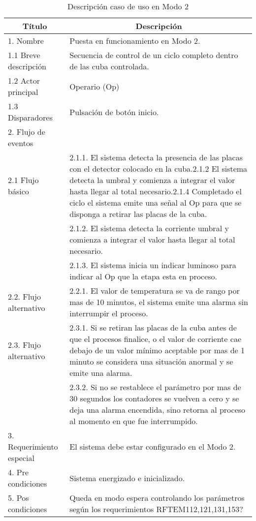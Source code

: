 \begin{table}[h!]
\begin{flushleft}
\begin{tabular}{|m{3cm}|m{11cm}|}
\hline
\multicolumn{1}{|c|}{\textbf{Título}} & \multicolumn{1}{c|}{\textbf{Descripción}} \\ \hline
1. Nombre & Puesta en funcionamiento en Modo 2. \\ \hline
1.1 Breve descripción  & Secuencia de control de un ciclo completo dentro de las cuba controlada. \\ \hline
1.2 Actor principal  & Operario (Op) \\ \hline
1.3 Disparadores  & Pulsación de botón inicio. \\ \hline
2. Flujo de eventos &  \\ \hline
\multicolumn{ 1}{|l|}{2.1 Flujo básico} & 2.1.1. El sistema detecta la presencia de las placas con el detector colocado en la cuba.2.1.2  El sistema detecta la  umbral y comienza a integrar el valor hasta llegar al total necesario.2.1.4  Completado el ciclo el sistema emite una señal al Op para que se disponga a retirar las placas de la cuba. \\ \cline{ 2- 2}
\multicolumn{ 1}{|l|}{} & 2.1.2. El sistema detecta la corriente umbral y comienza a integrar el valor hasta llegar al total necesario. \\ \cline{ 2- 2}
\multicolumn{ 1}{|l|}{} & 2.1.3. El sistema inicia un indicar luminoso para indicar al Op que la etapa esta en proceso. \\ \hline
\multicolumn{ 1}{|l|}{2.2. Flujo alternativo} & 2.2.1. El valor de temperatura se va de rango por mas de 10 minutos, el sistema emite una alarma sin interrumpir el proceso. \\ \hline
\multicolumn{ 1}{|l|}{2.3. Flujo alternativo} & 2.3.1. Si se retiran las placas de la cuba antes de que el procesos finalice, o el valor de corriente cae debajo de un valor mínimo aceptable por mas de 1 minuto se considera una situación anormal y se emite una alarma.  \\ \cline{ 2- 2}
\multicolumn{ 1}{|l|}{} & 
2.3.2. Si no se restablece el parámetro por mas de 30 segundos los contadores se vuelven a cero y se deja una alarma encendida, sino retorna al proceso al momento en que fue interrumpido. \\ \hline
3. Requerimiento especial & El sistema debe estar configurado en el Modo 2.\\ \hline
4. Pre condiciones  & Sistema energizado e inicializado.  \\ \hline
5. Pos condiciones & Queda en modo espera controlando los parámetros según los requerimientos RFTEM112,121,131,153? \\ \hline
\end{tabular}
\end{flushleft}
\caption{Descripción caso de uso en Modo 2}
\label{caso_uso_func_2}
\end{table}


